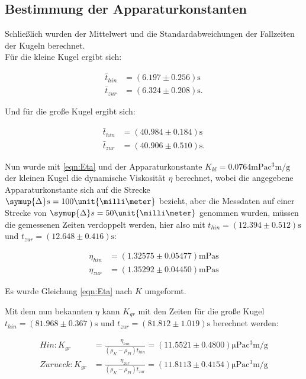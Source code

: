 \subsection{Bestimmung der Apparaturkonstanten}

Schließlich wurden der Mittelwert und die Standardabweichungen der Fallzeiten der Kugeln berechnet.\\
Für die kleine Kugel ergibt sich:

\begin{align*}
  \bar{t}_{hin} &=(6.197\pm 0.256)\unit{\second}\\
  \bar{t}_{zur} &=(6.324\pm 0.208)\unit{\second}.
\end{align*}

Und für die große Kugel ergibt sich:

\begin{align*}
  \bar{t}_{hin} &=(40.984\pm 0.184)\unit{\second}\\
  \bar{t}_{zur} &=(40.906\pm 0.510)\unit{\second}.
\end{align*}

Nun wurde mit \eqref{eqn:Eta} und der Apparaturkonstante $K_{kl} = 0.0764\unit{\milli\pascal\cubic\centi\meter\per\gram}$
der kleinen Kugel die dynamische Viskosität $\eta$ berechnet, wobei die angegebene Apparaturkonstante sich auf die Strecke
$\symup{\Delta}s = 100\unit{\milli\meter}$ bezieht, aber die Messdaten auf einer Strecke von $\symup{\Delta}s = 50\unit{\milli\meter}$ genommen wurden,
müssen die gemessenen Zeiten verdoppelt werden, hier also mit $t_{hin} = (12.394\pm 0.512)\unit{\second}$ und $t_{zur} = (12.648\pm 0.416)\unit{\second}$:


\begin{align*}
  \eta_{hin} &= (1.32575\pm 0.05477)\unit{\milli\pascal\second}\\
  \eta_{zur} &= (1.35292\pm 0.04450)\unit{\milli\pascal\second}
\end{align*}

Es wurde Gleichung \eqref{eqn:Eta} nach $K$ umgeformt. 

Mit dem nun bekannten $\eta$ kann $K_{gr}$ mit
den Zeiten für die große Kugel $t_{hin} = (81.968\pm 0.367)\unit{\second}$ und $t_{zur} = (81.812\pm 1.019)\unit{\second}$ berechnet werden:

\begin{align*}
  Hin : K_{gr} &= \frac{\eta_{hin}}{(\rho_K-\rho_{Fl})t_{hin}} = (11.5521\pm 0.4800)\unit{\micro\pascal\cubic\centi\meter\per\gram}\\
  Zurueck : K_{gr} &= \frac{\eta_{zur}}{(\rho_K-\rho_{Fl})t_{zur}} = (11.8113\pm 0.4154)\unit{\micro\pascal\cubic\centi\meter\per\gram}
\end{align*}


